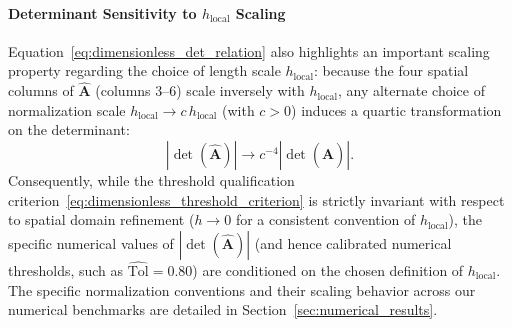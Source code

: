 \documentclass[preprint,12pt]{elsarticle}
\begin{document}
\paragraph{Determinant Sensitivity to $h_{\mathrm{local}}$ Scaling}
Equation~\eqref{eq:dimensionless_det_relation} also highlights an important scaling property regarding the choice of length scale $h_{\mathrm{local}}$: because the four spatial columns of $\widehat{\mathbf{A}}$ (columns 3--6) scale inversely with $h_{\mathrm{local}}$, any alternate choice of normalization scale $h_{\mathrm{local}} \to c \, h_{\mathrm{local}}$ (with $c > 0$) induces a quartic transformation on the determinant:
\begin{equation}
    |\det(\widehat{\mathbf{A}})| \longrightarrow c^{-4} |\det(\widehat{\mathbf{A}})|.
    \label{eq:quartic_h_local_scaling}
\end{equation}
Consequently, while the threshold qualification criterion~\eqref{eq:dimensionless_threshold_criterion} is strictly invariant with respect to spatial domain refinement ($h \to 0$ for a consistent convention of $h_{\mathrm{local}}$), the specific numerical values of $|\det(\widehat{\mathbf{A}})|$ (and hence calibrated numerical thresholds, such as $\widehat{\mathrm{Tol}} = 0.80$) are conditioned on the chosen definition of $h_{\mathrm{local}}$. The specific normalization conventions and their scaling behavior across our numerical benchmarks are detailed in Section~\ref{sec:numerical_results}.
\end{document}
